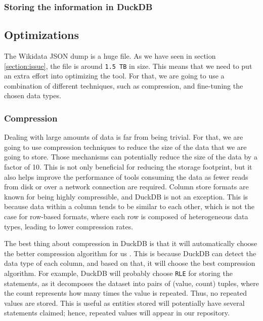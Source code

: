 \label{section:duckdb_load}
\subsubsection{Storing the information in DuckDB}

\subsection{Optimizations}

The Wikidata JSON dump is a huge file. As we have seen in section \ref{section:issue}, the file is around \texttt{1.5 TB} in size. This means that we need to put an extra effort into optimizing the tool. For that, we are going to use a combination of different techniques, such as compression, and fine-tuning the chosen data types.

\subsubsection{Compression}

Dealing with large amounts of data is far from being trivial. For that, we are going to use compression techniques to reduce the size of the data that we are going to store. Those mechanisms can potentially reduce the size of the data by a factor of 10. This is not only beneficial for reducing the storage footprint, but it also helps improve the performance of tools consuming the data as fewer reads from disk or over a network connection are required. Column store formats are known for being highly compressible, and DuckDB is not an exception. This is because data within a column tends to be similar to each other, which is not the case for row-based formats, where each row is composed of heterogeneous data types, leading to lower compression rates.

The best thing about compression in DuckDB is that it will automatically choose the better compression algorithm for us \cite{Raasveldt_2022}. This is because DuckDB can detect the data type of each column, and based on that, it will choose the best compression algorithm. For example, DuckDB will probably choose \texttt{RLE} for storing the statements, as it decomposes the dataset into pairs of (value, count) tuples, where the count represents how many times the value is repeated. Thus, no repeated values are stored. This is useful as entities stored will potentially have several statements claimed; hence, repeated values will appear in our repository.

